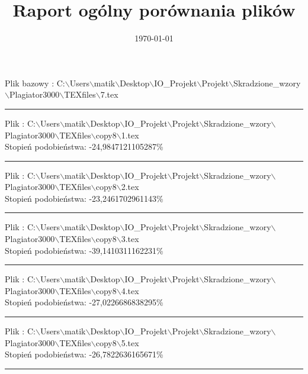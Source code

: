 \documentclass{article}
\begin{document}
\title{\huge\bfseries Raport ogólny porównania plików }
\date{\today}
\maketitle
\begin{flushleft}
Plik bazowy : C:$\backslash$Users$\backslash$matik$\backslash$Desktop$\backslash$IO\_Projekt$\backslash$Projekt$\backslash$Skradzione\_wzory$\backslash$Plagiator3000$\backslash$TEXfiles$\backslash$7.tex
\end{flushleft}
\hrule
\begin{flushleft}
Plik : C:$\backslash$Users$\backslash$matik$\backslash$Desktop$\backslash$IO\_Projekt$\backslash$Projekt$\backslash$Skradzione\_wzory$\backslash$Plagiator3000$\backslash$TEXfiles$\backslash$copy8$\backslash$1.tex\\
{\huge Stopień podobieństwa: -24,9847121105287\%} \\ 

\end{flushleft}
\hrule
\begin{flushleft}
Plik : C:$\backslash$Users$\backslash$matik$\backslash$Desktop$\backslash$IO\_Projekt$\backslash$Projekt$\backslash$Skradzione\_wzory$\backslash$Plagiator3000$\backslash$TEXfiles$\backslash$copy8$\backslash$2.tex\\
{\huge Stopień podobieństwa: -23,2461702961143\%} \\ 

\end{flushleft}
\hrule
\begin{flushleft}
Plik : C:$\backslash$Users$\backslash$matik$\backslash$Desktop$\backslash$IO\_Projekt$\backslash$Projekt$\backslash$Skradzione\_wzory$\backslash$Plagiator3000$\backslash$TEXfiles$\backslash$copy8$\backslash$3.tex\\
{\huge Stopień podobieństwa: -39,1410311162231\%} \\ 

\end{flushleft}
\hrule
\begin{flushleft}
Plik : C:$\backslash$Users$\backslash$matik$\backslash$Desktop$\backslash$IO\_Projekt$\backslash$Projekt$\backslash$Skradzione\_wzory$\backslash$Plagiator3000$\backslash$TEXfiles$\backslash$copy8$\backslash$4.tex\\
{\huge Stopień podobieństwa: -27,0226686838295\%} \\ 

\end{flushleft}
\hrule
\begin{flushleft}
Plik : C:$\backslash$Users$\backslash$matik$\backslash$Desktop$\backslash$IO\_Projekt$\backslash$Projekt$\backslash$Skradzione\_wzory$\backslash$Plagiator3000$\backslash$TEXfiles$\backslash$copy8$\backslash$5.tex\\
{\huge Stopień podobieństwa: -26,7822636165671\%} \\ 

\end{flushleft}
\hrule
\end{document}
